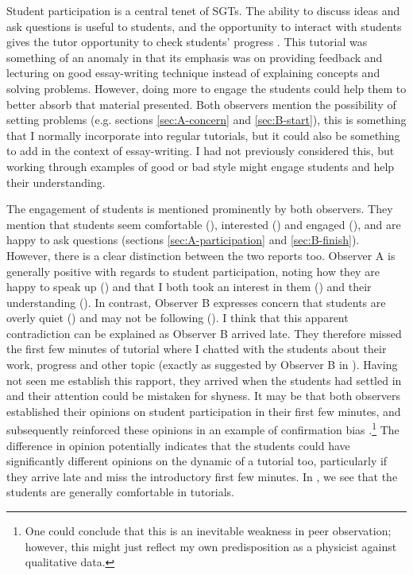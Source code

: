 Student participation is a central tenet of SGTs. The ability to discuss ideas and ask questions is useful to students, and the opportunity to interact with students gives the tutor opportunity to check students' progress \citep[cf.][chapter 6]{Jaques2007}. This tutorial was something of an anomaly in that its emphasis was on providing feedback and lecturing on good essay-writing technique instead of explaining concepts and solving problems. However, doing more to engage the students could help them to better absorb that material presented. Both observers mention the possibility of setting problems (e.g. sections \ref{sec:A-concern} and \ref{sec:B-start}), this is something that I normally incorporate into regular tutorials, but it could also be something to add in the context of essay-writing. I had not previously considered this, but working through examples of good or bad style might engage students and help their understanding.

The engagement of students is mentioned prominently by both observers. They mention that students seem comfortable (), interested () and engaged (), and are happy to ask questions (sections \ref{sec:A-participation} and \ref{sec:B-finish}). However, there is a clear distinction between the two reports too. Observer A is generally positive with regards to student participation, noting how they are happy to speak up () and that I both took an interest in them () and their understanding (). In contrast, Observer B expresses concern that students are overly quiet () and may not be following (). I think that this apparent contradiction can be explained as Observer B arrived late. They therefore missed the first few minutes of tutorial where I chatted with the students about their work, progress and other topic (exactly as suggested by Observer B in ). Having not seen me establish this rapport, they arrived when the students had settled in and their attention could be mistaken for shyness. It may be that both observers established their opinions on student participation in their first few minutes, and subsequently reinforced these opinions in an example of confirmation bias \citep{Ross1975,Lord1979}.\footnote{One could conclude that this is an inevitable weakness in peer observation; however, this might just reflect my own predisposition as a physicist against qualitative data.} The difference in opinion potentially indicates that the students could have significantly different opinions on the dynamic of a tutorial too, particularly if they arrive late and miss the introductory first few minutes. In , we see that the students are generally comfortable in tutorials.

